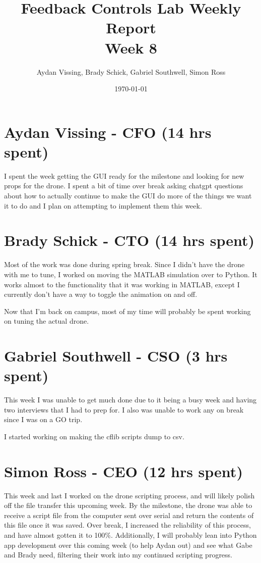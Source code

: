 \documentclass[12pt, titlepage]{article}
\title{Feedback Controls Lab Weekly Report \\ \normalsize{Week 8}}
\author{Aydan Vissing, Brady Schick, Gabriel Southwell, Simon Ross}
\date{\today}
\begin{document}
\maketitle

\section*{Aydan Vissing - CFO (14 hrs spent)}

I spent the week getting the GUI ready for the milestone and looking for new props for the drone. I spent a bit of time over break asking chatgpt questions about how to actually continue to make the GUI do more of the things we want it to do and I plan on attempting to implement them this week. 

\section*{Brady Schick - CTO (14 hrs spent)}

Most of the work was done during spring break. Since I didn't have the drone with me to tune, I worked on moving the MATLAB simulation over to Python. It works almost to the functionality that it was working in MATLAB, except I currently don't have a way to toggle the animation on and off.

Now that I'm back on campus, most of my time will probably be spent working on tuning the actual drone.

\section*{Gabriel Southwell - CSO (3 hrs spent)}

This week I was unable to get much done due to it being a busy week and having two interviews that I had to prep for. I also was unable to work any on break since I was on a GO trip.

I started working on making the cflib scripts dump to csv. 

\section*{Simon Ross - CEO (12 hrs spent)}

This week and last I worked on the drone scripting process, and will likely polish off the file transfer this upcoming week. By the milestone, the drone was able to receive a script file from the computer sent over serial and return the contents of this file once it was saved. Over break, I increased the reliability of this process, and have almost gotten it to 100\%. Additionally, I will probably lean into Python app development over this coming week (to help Aydan out) and see what Gabe and Brady need, filtering their work into my continued scripting progress.
\end{document}
